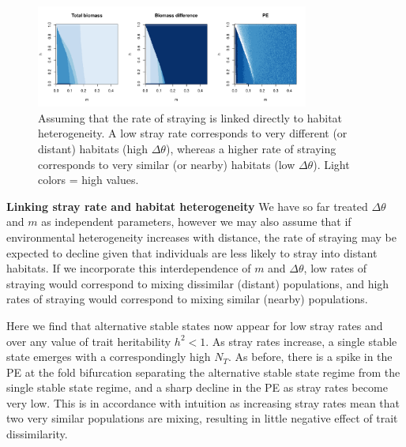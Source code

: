 \documentclass[twocolumn,preprintnumbers,amsmath,amssymb,superscriptaddress]{revtex4}
\begin{document}
\begin{figure}
  \centering
  \includegraphics[width=0.8\textwidth]{figs/fig_MDPE_hm_mtheta.pdf}
  \caption{
  Assuming that the rate of straying is linked directly to habitat heterogeneity. A low stray rate corresponds to very different (or distant) habitats (high $\Delta\theta$), whereas a higher rate of straying corresponds to very similar (or nearby) habitats (low $\Delta\theta$). Light colors = high values.
  } \label{fig:mtheta}
\end{figure}








{\bf Linking stray rate and habitat heterogeneity} We have so far treated $\Delta\theta$ and $m$ as independent parameters, however we may also assume that if environmental heterogeneity increases with distance, the rate of straying may be expected to decline given that individuals are less likely to stray into distant habitats. %
If we incorporate this interdependence of $m$ and $\Delta\theta$, low rates of straying would correspond to mixing dissimilar (distant) populations, and high rates of straying would correspond to mixing similar (nearby) populations.

Here we find that alternative stable states now appear for low stray rates and over any value of trait heritability $h^2<1$.
As stray rates increase, a single stable state emerges with a correspondingly high $N_T$.
As before, there is a spike in the PE at the fold bifurcation separating the alternative stable state regime from the single stable state regime, and a sharp decline in the PE as stray rates become very low.
This is in accordance with intuition as increasing stray rates mean that two very similar populations are mixing, resulting in little negative effect of trait dissimilarity.
\end{document}
